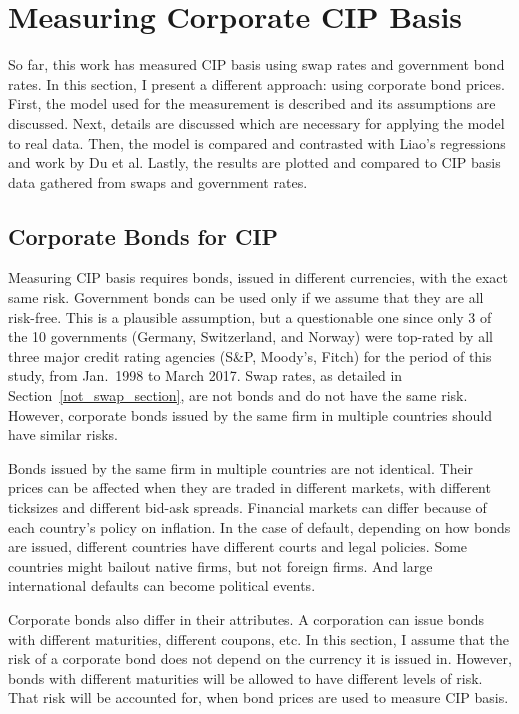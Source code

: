 \section{Measuring Corporate CIP Basis} \label{corp_cip_chapter}

So far, this work has measured CIP basis using swap rates and government bond rates.  In this section, I present a different approach: using corporate bond prices.  First, the model used for the measurement is described and its assumptions are discussed.  Next, details are discussed which are necessary for applying the model to real data.  Then, the model is compared and contrasted with Liao's regressions and work by Du et al.  Lastly, the results are plotted and compared to CIP basis data gathered from swaps and government rates.  

\subsection{Corporate Bonds for CIP}

Measuring CIP basis requires bonds, issued in different currencies, with the exact same risk.  Government bonds can be used only if we assume that they are all risk-free.  This is a plausible assumption, but a questionable one since only 3 of the 10 governments (Germany, Switzerland, and Norway) were top-rated by all three major credit rating agencies (S\&P, Moody's, Fitch) for the period of this study, from Jan.\ 1998 to March 2017.\cite{TradingEconomics}  Swap rates, as detailed in Section~\ref{not_swap_section}, are not bonds and do not have the same risk.  However, corporate bonds issued by the same firm in multiple countries should have similar risks.


Bonds issued by the same firm in multiple countries are not identical.  Their prices can be affected when they are traded in different markets, with different ticksizes and different bid-ask spreads.  Financial markets can differ because of each country's policy on inflation.  In the case of default, depending on how bonds are issued, different countries have different courts and legal policies.  Some countries might bailout native firms, but not foreign firms.  And large international defaults can become political events.  

Corporate bonds also differ in their attributes.  A corporation can issue bonds with different maturities, different coupons, etc.  In this section, I assume that the risk of a corporate bond does not depend on the currency it is issued in.  However, bonds with different maturities will be allowed to have different levels of risk.  That risk will be accounted for, when bond prices are used to measure CIP basis.

